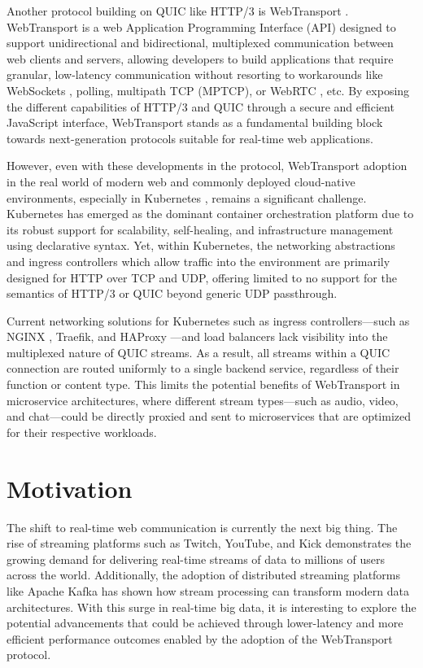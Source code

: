 Another protocol building on QUIC like HTTP/3 is WebTransport \cite{webtransport-draft}. WebTransport \cite{webtransport-mdn} is a web Application Programming Interface (API) designed to support unidirectional and bidirectional, multiplexed communication between web clients and servers, allowing developers to build applications that require granular, low-latency communication without resorting to workarounds like WebSockets \cite{rfc6455}, polling, multipath TCP (MPTCP), or WebRTC \cite{webrtc}, etc. By exposing the different capabilities of HTTP/3 \cite{marx2021-http3} and QUIC through a secure and efficient JavaScript interface, WebTransport stands as a fundamental building block towards next-generation protocols suitable for real-time web applications.

However, even with these developments in the protocol, WebTransport adoption in the real world of modern web and commonly deployed cloud-native environments, especially in Kubernetes \cite{kubernetes-docs}, remains a significant challenge. Kubernetes has emerged as the dominant container orchestration platform due to its robust support for scalability, self-healing, and infrastructure management using declarative syntax. Yet, within Kubernetes, the networking abstractions and ingress controllers which allow traffic into the environment are primarily designed for HTTP over TCP and UDP, offering limited to no support for the semantics of HTTP/3 or QUIC beyond generic UDP passthrough.

Current networking solutions for Kubernetes such as ingress controllers—such as NGINX \cite{nginx-ingress-docs}, Traefik, and HAProxy \cite{haproxy-k8s-docs}—and load balancers lack visibility into the multiplexed nature of QUIC streams. As a result, all streams within a QUIC connection are routed uniformly to a single backend service, regardless of their function or content type. This limits the potential benefits of WebTransport in microservice architectures, where different stream types—such as audio, video, and chat—could be directly proxied and sent to microservices that are optimized for their respective workloads.




\section{Motivation}

The shift to real-time web communication is currently the next big thing. The rise of streaming platforms such as Twitch, YouTube, and Kick demonstrates the growing demand for delivering real-time streams of data to millions of users across the world. Additionally, the adoption of distributed streaming platforms like Apache Kafka \cite{kreps2011} has shown how stream processing can transform modern data architectures. With this surge in real-time big data, it is interesting to explore the potential advancements that could be achieved through lower-latency and more efficient performance outcomes enabled by the adoption of the WebTransport protocol.

